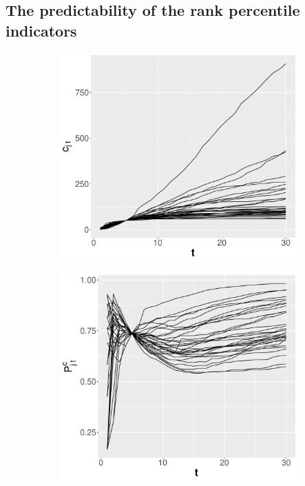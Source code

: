 \subsection*{The predictability of the rank percentile indicators}
\begin{figure}[ht!]
     \centering
     \begin{subfigure}[b]{0.48\textwidth}
         \centering
         \includegraphics[width=\textwidth]{figures/pred_power/ncit_vs_pubrp/cit_age.pdf}
         \caption{}
         \label{fig:pred_cit_age}
     \end{subfigure}
     \hfill
     \begin{subfigure}[b]{0.48\textwidth}
         \centering
         \includegraphics[width=\textwidth]{figures/pred_power/ncit_vs_pubrp/rp_age.pdf}

\end{subfigure}
\end{figure}
